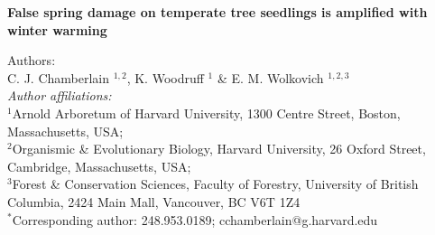 \documentclass{article}
\begin{document}
\noindent \textbf{\Large{False spring damage on temperate tree seedlings is amplified with winter warming}}

\noindent Authors:\\
C. J. Chamberlain $^{1,2}$, K. Woodruff $^{1}$ \& E. M. Wolkovich $^{1,2,3}$
\vspace{2ex}\\
\emph{Author affiliations:}\\
$^{1}$Arnold Arboretum of Harvard University, 1300 Centre Street, Boston, Massachusetts, USA; \\
$^{2}$Organismic \& Evolutionary Biology, Harvard University, 26 Oxford Street, Cambridge, Massachusetts, USA; \\
$^{3}$Forest \& Conservation Sciences, Faculty of Forestry, University of British Columbia, 2424 Main Mall, Vancouver, BC V6T 1Z4\\
\vspace{2ex}
$^*$Corresponding author: 248.953.0189; cchamberlain@g.harvard.edu\\

\renewcommand{\thetable}{\arabic{table}}
\renewcommand{\thefigure}{\arabic{figure}}
\renewcommand{\labelitemi}{$-$}
\end{document}
